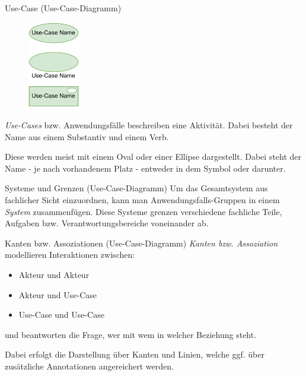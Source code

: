 \begin{diag}{Use-Case (Use-Case-Diagramm)}
    \begin{figure}
        \centering
        \includegraphics[width=0.2\textwidth]{includes/figures/defi_diagrams_use_case.pdf}
    \end{figure}
    \emph{Use-Cases} bzw. Anwendungsfälle beschreiben eine Aktivität.
    Dabei besteht der Name aus einem Substantiv und einem Verb.

    Diese werden meist mit einem Oval oder einer Ellipse dargestellt.
    Dabei steht der Name - je nach vorhandenem Platz - entweder in dem Symbol oder darunter.

    \vspace{8em}
\end{diag}

\begin{diag}{Systeme und Grenzen (Use-Case-Diagramm)}
    Um das Gesamtsystem aus fachlicher Sicht einzuordnen, kann man Anwendungsfalls-Gruppen in einem \emph{System} zusammenfügen.
    Diese Systeme grenzen verschiedene fachliche Teile, Aufgaben bzw. Verantwortungsbereiche voneinander ab.

\end{diag}

\begin{diag}{Kanten bzw. Assoziationen (Use-Case-Diagramm)}
    \emph{Kanten bzw. Assoziation} modellieren Interaktionen zwischen:
    \begin{itemize}
        \item Akteur und Akteur
        \item Akteur und Use-Case
        \item Use-Case und Use-Case
    \end{itemize}
    und beantworten die Frage, wer mit wem in welcher Beziehung steht.

    Dabei erfolgt die Darstellung über Kanten und Linien, welche ggf. über zusätzliche Annotationen angereichert werden.
\end{diag}


